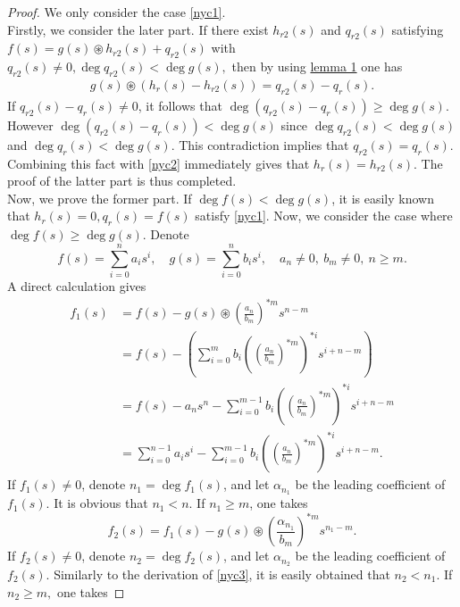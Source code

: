 \documentclass[12pt,a4paper,fleqn,twoside]{article}
\theoremstyle{plain}
\begin{document}
	\begin{proof}
		We only consider the case \eqref{nyc1}.\\
		\indent Firstly, we consider the later part. If there exist $h_{r2}(s)$ and $q_{r2}(s)$ satisfying $f(s)=g(s)\circledast h_{r2}(s)+q_{r2}(s)$ with $q_{r2}(s)\neq 0, \deg q_{r2}(s)<\deg g(s),$ then by using \hyperref[lemma 1]{lemma 1} one has
		\begin{align}
			g(s)\circledast(h_r(s)-h_{r2}(s))=q_{r2}(s)-q_r(s).\label{nyc2}
		\end{align}
		If $q_{r2}(s)-q_r(s)\neq 0$, it follows that $\deg(q_{r2}(s)-q_r(s))\ge \deg g(s).$ However $\deg(q_{r2}(s)-q_r(s))<\deg g(s)$ since $\deg q_{r2}(s)<\deg g(s)$ and $\deg q_r(s)<\deg g(s).$ This contradiction implies that $q_{r2}(s)=q_r(s).$ Combining this fact with \eqref{nyc2} immediately gives that $h_r(s)=h_{r2}(s).$ The proof of the latter part is thus completed.\\
		\indent Now, we prove the former part. If $\deg f(s)<\deg g(s)$, it is easily known that $h_r(s)=0,q_r(s)=f(s)$ satisfy \eqref{nyc1}. Now, we consider the case where $\deg f(s)\ge \deg g(s)$. Denote
		\[f(s)=\displaystyle\sum_{i=0}^{n}a_i s^i,\quad g(s)=\displaystyle\sum_{i=0}^{n}b_i s^i,\quad a_n\neq0,\:b_m\neq0,\: n\ge m.\]
		A direct calculation gives
		\begin{equation}
			\begin{aligned}
				f_1(s)&=f(s)-g(s)\circledast \left(\frac{a_n}{b_m}\right)^{*m}s^{n-m}\\
				&=f(s)-\left(\displaystyle\sum_{i=0}^{m}b_i\left(\left(\frac{a_n}{b_m}\right)^{*m}\right)^{*i}s^{i+n-m}\right)\\
				&=f(s)-a_ns^n -\displaystyle\sum_{i=0}^{m-1}b_i \left(\left(\frac{a_n}{b_m}\right)^{*m}\right)^{*i}s^{i+n-m}\\
				&=\displaystyle\sum_{i=0}^{n-1}a_is^i-\sum_{i=0}^{m-1}b_i\left(\left(\frac{a_n}{b_m}\right)^{*m}\right)^{*i}s^{i+n-m}.
			\end{aligned}
		\label{nyc3}
		\end{equation}
		If $f_1(s)\neq 0$, denote $n_1=\deg f_1(s)$, and let $\alpha_{n_{1}}$ be the leading coefficient of $f_1(s).$ It is obvious that $n_1<n.$ If $n_1 \ge m$, one takes 
		\[f_2(s)=f_1(s)-g(s)\circledast \left(\frac{\alpha_{n_{1}}}{b_m}\right)^{*m}s^{n_1-m}.\]
		If $f_2(s)\neq 0$, denote $n_2=\deg f_2(s)$, and let $\alpha_{n_{2}}$ be the leading coefficient of $f_2(s).$ Similarly to the derivation of \eqref{nyc3}, it is easily obtained that $n_2<n_1.$ If $n_2 \ge m,$ one takes

\end{proof}
\end{document}
